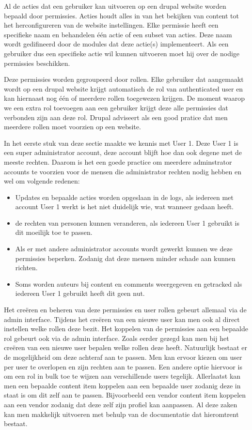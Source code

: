 Al de acties dat een gebruiker kan uitvoeren op een drupal website worden bepaald door permissies. Acties houdt alles in van het bekijken van content tot het herconfigureren van de website instellingen. Elke permissie heeft een specifieke naam en behandelen één actie of een subset van acties. Deze naam wordt gedifineerd door de modules dat deze actie(s) implementeert. Als een gebruiker dus een specifieke actie wil kunnen uitvoeren moet hij over de nodige permissies beschikken.

Deze permissies worden gegroupeerd door rollen. Elke gebruiker dat aangemaakt wordt op een drupal website krijgt automatisch de rol van authenticated user en kan hiernaast nog één of meerdere rollen toegewezen krijgen. De moment waarop we een extra rol toevoegen aan een gebruiker krijgt deze alle permissies dat verbonden zijn aan deze rol. Drupal adviseert als een good pratice dat men meerdere rollen moet voorzien op een website.

In het eerste stuk van deze sectie maakte we kennis met User 1. Deze User 1 is een super administrator account, deze account blijft hoe dan ook degene met de meeste rechten. Daarom is het een goede practice om meerdere adminstrator accounts te voorzien voor de mensen die administrator rechten nodig hebben en wel om volgende redenen:

\begin{itemize}
	\item Updates en bepaalde acties worden opgeslaan in de logs, als iedereen met account User 1 werkt is het niet duidelijk wie, wat wanneer gedaan heeft.
	\item de rechten van personen kunnen veranderen, als iedereen User 1 gebruikt is dit moeilijk toe te passen.
	\item Als er met andere administrator accounts wordt gewerkt kunnen we deze permissies beperken. Zodanig dat deze mensen minder schade aan kunnen richten.
	\item Soms worden auteurs bij content en comments weergegeven en getracked als iedereen User 1 gebruikt heeft dit geen nut.
\end{itemize}
 
Het creëren en beheren van deze permissies en user rollen gebeurt allemaal via de admin interface. Tijdens het creëren van een nieuwe user kan men ook al direct instellen welke rollen deze bezit. Het koppelen van de permissies aan een bepaalde rol gebeurt ook via de admin interface. Zoals eerder gezegd kan men bij het creëren van een nieuwe user bepalen welke rollen deze heeft. Natuurlijk bestaat er de mogelijkheid om deze achteraf aan te passen. Men kan ervoor kiezen om user per user te overlopen en zijn rechten aan te passen. Een andere optie hiervoor is om een rol in bulk toe te wijzen aan verschillende users tegelijk. Allerlaatst kan men een bepaalde content item koppelen aan een bepaalde user zodanig deze in staat is om dit zelf aan te passen. Bijvoorbeeld een vendor content item koppelen aan een vendor  zodanig dat deze zelf zijn profiel kan aanpassen. Al deze zaken kan men makkelijk uitvoeren met behulp van de documentatie dat hieromtrent bestaat.

